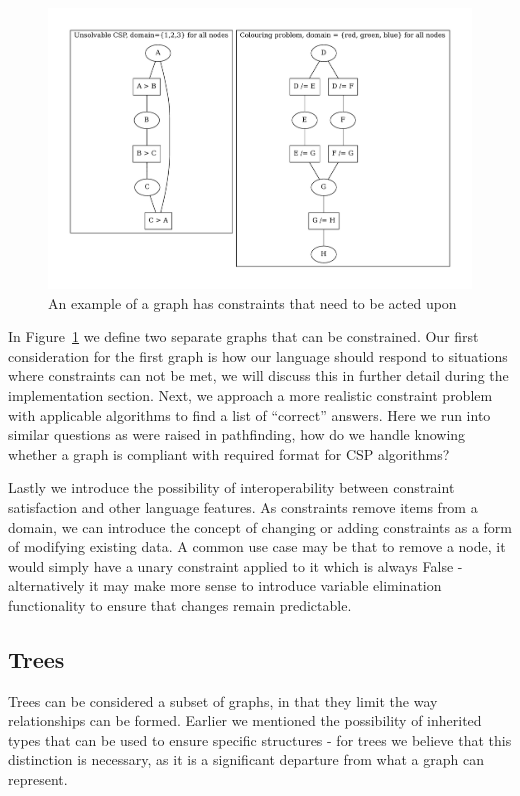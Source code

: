\begin{figure}[H]
    \centering
    \includegraphics[width=12cm]{figures/example_graphs/constraint_satisfaction.gv}
    \caption{An example of a graph has constraints that need to be acted upon}
    \label{fig:example_constraint_graph}
\end{figure}

In Figure~\ref{fig:example_constraint_graph} we define two separate graphs that can be constrained.
Our first consideration for the first graph is how our language should respond to situations where constraints can not
be met, we will discuss this in further detail during the implementation section.
Next, we approach a more realistic constraint problem with applicable algorithms to find a list of ``correct'' answers.
Here we run into similar questions as were raised in pathfinding, how do we handle knowing whether a graph is compliant
with required format for CSP algorithms?

Lastly we introduce the possibility of interoperability between constraint satisfaction and other language features.
As constraints remove items from a domain, we can introduce the concept of changing or adding constraints as a form
of modifying existing data.
A common use case may be that to remove a node, it would simply have a unary constraint applied to it which is always
False - alternatively it may make more sense to introduce variable elimination functionality to ensure that changes
remain predictable.

\subsection{Trees}\label{subsec:trees}
Trees can be considered a subset of graphs, in that they limit the way relationships can be formed.
Earlier we mentioned the possibility of inherited types that can be used to ensure specific structures - for trees we
believe that this distinction is necessary, as it is a significant departure from what a graph can represent.

